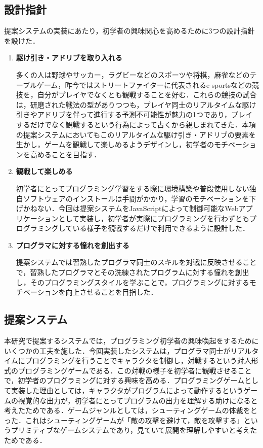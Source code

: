 \subsection{設計指針}

提案システムの実装にあたり，初学者の興味関心を高めるために3つの設計指針を設けた．

\begin{enumerate}
  \item {\bf 駆け引き・アドリブを取り入れる}

  多くの人は野球やサッカー，ラグビーなどのスポーツや将棋，麻雀などのテーブルゲーム，昨今ではストリートファイターに代表されるe-sportsなどの競技を，自分がプレイヤでなくとも観戦することを好む．これらの競技の試合は，研磨された戦法の型がありつつも，プレイヤ同士のリアルタイムな駆け引きやアドリブを伴って進行する予測不可能性が魅力の1つであり，プレイするだけでなく観戦するという行為によって古くから親しまれてきた．本項の提案システムにおいてもこのリアルタイムな駆け引き・アドリブの要素を生かし，ゲームを観戦して楽しめるようデザインし，初学者のモチベーションを高めることを目指す．

  
  \item {\bf 観戦して楽しめる}

	初学者にとってプログラミング学習をする際に環境構築や普段使用しない独自ソフトウェアのインストールは手間がかかり，学習のモチベーションを下げかねない．今回は提案システムをJavaScriptによって制御可能なWebアプリケーションとして実装し，初学者が実際にプログラミングを行わずともプログラミングしている様子を観戦するだけで利用できるように設計した．

	\item {\bf プログラマに対する憧れを創出する}

  提案システムでは習熟したプログラマ同士のスキルを対戦に反映させることで，習熟したプログラマとその洗練されたプログラムに対する憧れを創出し，そのプログラミングスタイルを学ぶことで，プログラミングに対するモチベーションを向上させることを目指した．

\end{enumerate}

\subsection{提案システム}

本研究で提案するシステムでは，プログラミング初学者の興味喚起をするためにいくつかの工夫を施した．今回実装したシステムは，プログラマ同士がリアルタイムにプログラミングを行うことでキャラクタを制御し，対戦するという対人形式のプログラミングゲームである．この対戦の様子を初学者に観戦させることで，初学者のプログラミングに対する興味を高める．プログラミングゲームとして実装した理由としては，キャラクタがプログラムによって動作するというゲームの視覚的な出力が，初学者にとってプログラムの出力を理解する助けになると考えたためである．ゲームジャンルとしては，シューティングゲームの体裁をとった．これはシューティングゲームが「敵の攻撃を避けて，敵を攻撃する」というプリミティブなゲームシステムであり，見ていて展開を理解しやすいと考えたためである．

